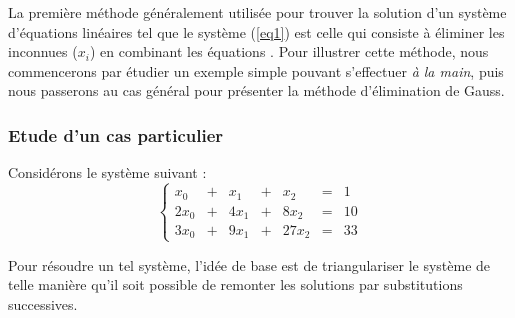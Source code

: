 La première méthode généralement utilisée pour trouver la solution 
d'un système d'équa\-tions linéaires tel que le système (\ref{eq1}) 
est celle qui consiste à éliminer les inconnues 
($x_i$) en combinant les équations \cite{florent77}\label{cite:florent2}.
Pour illustrer cette méthode, nous commencerons par étudier un exemple
simple pouvant s'effectuer {\em à la main}, 
puis nous passerons au cas général pour
présenter la méthode d'élimination de {\sc Gauss}.

\subsubsection*{Etude d'un cas particulier}
\label{casparticulier}
Considérons le système suivant :
$$\left\{
\begin{array}{rcrcrcr}
 x_0 & + &  x_1 & + &   x_2 & = &  1 \\
2x_0 & + & 4x_1 & + &  8x_2 & = & 10 \\
3x_0 & + & 9x_1 & + & 27x_2 & = & 33
\end{array}
\right.$$

Pour résoudre un tel système, l'idée de base est de triangulariser 
le système de telle manière qu'il soit possible de remonter les
solutions par substitutions successives.

